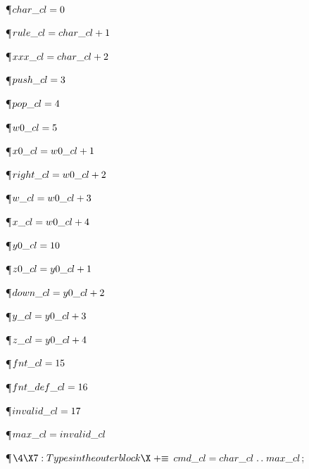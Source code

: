 \Y\P\D {}$\\{char\_cl}=0$\par
\P\D {}$\\{rule\_cl}=\\{char\_cl}+1$\par
\P\D {}$\\{xxx\_cl}=\\{char\_cl}+2$\par
\P\D {}$\\{push\_cl}=3$\par
\P\D {}$\\{pop\_cl}=4$\par
\P\D {}$\\{w0\_cl}=5$\par
\P\D {}$\\{x0\_cl}=\\{w0\_cl}+1$\par
\P\D {}$\\{right\_cl}=\\{w0\_cl}+2$\par
\P\D {}$\\{w\_cl}=\\{w0\_cl}+3$\par
\P\D {}$\\{x\_cl}=\\{w0\_cl}+4$\par
\P\D {}$\\{y0\_cl}=10$\par
\P\D {}$\\{z0\_cl}=\\{y0\_cl}+1$\par
\P\D {}$\\{down\_cl}=\\{y0\_cl}+2$\par
\P\D {}$\\{y\_cl}=\\{y0\_cl}+3$\par
\P\D {}$\\{z\_cl}=\\{y0\_cl}+4$\par
\P\D {}$\\{fnt\_cl}=15$\par
\P\D {}$\\{fnt\_def\_cl}=16$\par
\P\D {}$\\{invalid\_cl}=17$\par
\P\D {}$\\{max\_cl}=\\{invalid\_cl}$\par
\Y\P$\4\X7:Types in the outer block\X\mathrel{+}\S$\6
$\\{cmd\_cl}=\\{char\_cl}\to\\{max\_cl}$;\par
\fi

